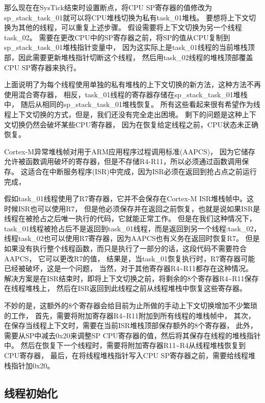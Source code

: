 那么现在在SysTick结束时设置断点，将CPU SP寄存器的值修改为sp\_stack\_task\_01就可以将CPU堆栈切换为私有task\_01堆栈。
要想将上下文切换为其他的线程，可以重复上述步骤。
假设需要将上下文切换为另一个线程task\_02。
需要在更改CPU中的SP寄存器之前，将SP的值从CPU复制到sp\_stack\_task\_01堆栈指针变量中，
因为这实际上是task\_01线程的当前堆栈顶部，因此需要更新堆栈指针切断这个线程，
然后用task\_02线程的堆栈顶部覆盖CPU SP寄存器来执行。

上面说明了为每个线程使用单独的私有堆栈的上下文切换的新方法，这种方法不再使用混合寄存器，
相反，task\_01线程的寄存器存储在sp\_stack\_task\_01堆栈中，
随后从相同的sp\_stack\_task\_01堆栈恢复。
所有这些看起来很有希望作为线程上下文切换的方式，但是，我们还没有完全走出困境。
剩下的问题是这种上下文切换仍然会破坏某些CPU寄存器，
因为在恢复给定线程之前，CPU状态未正确恢复。

Cortex-M异常堆栈帧对用于ARM应用程序过程调用标准(AAPCS)，
因为它储存允许被函数调用破坏的寄存器，但是不存储R4-R11，所以必须通过函数调用保存。
这适合在中断服务程序(ISR)中完成，因为ISR必须在返回到抢占点之前运行完成，

假如task\_01线程使用了R7寄存器，它并不会保存在Cortex-M ISR堆栈帧中。这时候ISR也可以使用R7，
但是他必须保存并在返回之前恢复，也就是说如果ISR是线程在被抢占之后唯一执行的代码，它就能正常工作。
但是在我们这种情况下，task\_01线程被抢占后不是返回到task\_01线程，而是返回到另一个线程:task\_02，
线程task\_02也可以使用R7寄存器，因为AAPCS也有义务在返回时恢复R7。
但是如果没有执行整个线程函数，而只是执行了一部分的话，这段代码不需要符合AAPCS，
它可以更改R7的值，
结果是，当task\_01恢复执行时，R7寄存器可能已经被破坏，这是一个问题，
当然，对于其他寄存器R4\textasciitilde R11都存在这种情况。
解决方案是在ISR结束时，即将上下文切换之前，将剩余的8个寄存器R4\textasciitilde R11保存在线程堆栈上，
然后在ISR返回到此线程之前从线程堆栈中恢复这些寄存器。

不妙的是，这额外的8个寄存器会给目前为止所做的手动上下文切换增加不少繁琐的工作，
首先，需要将附加寄存器R4\textasciitilde R11附加到所有线程的堆栈帧中，
其次，在保存当线程上下文时，需要在当前ISR堆栈顶部保存额外的8个寄存器，
此外，需要从SP中减去0x20来调整SP CPU寄存器的值，然后将其保存在线程的堆栈指针中。
然后在恢复下一个线程时，需要将附加寄存器R11\textasciitilde R4从线程堆栈恢复到CPU寄存器，
最后，在将线程堆栈指针写入CPU SP寄存器之前，需要给线程堆栈指针加0x20。


\subsection{线程初始化}

